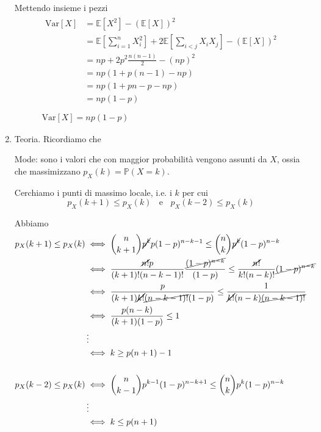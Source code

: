 \begin{enumerate}
\begin{tikzpicture}[x=0.75pt,y=0.75pt,yscale=-1,xscale=1]
\end{tikzpicture}


Mettendo insieme i pezzi\begin{gather*}
\begin{aligned}
\mathrm{Var}[ X] & =\mathbb{E}\left[ X^{2}\right] -(\mathbb{E}[ X])^{2}\\
 & =\mathbb{E}\left[\sum\limits _{i=1}^{n} X_{i}^{2}\right] +2\mathbb{E}\left[\sum\limits _{i< j} X_{i} X_{j}\right] -(\mathbb{E}[ X])^{2}\\
 & =np+2p^{2}\frac{n( n-1)}{2} -( np)^{2}\\
 & =np( 1+p( n-1) -np)\\
 & =np( 1+pn-p-np)\\
 & =np( 1-p)
\end{aligned}\\
\\
\boxed{\mathrm{Var}[ X] =np( 1-p)}
\end{gather*}
\item Teoria. Ricordiamo che

Mode: sono i valori che con maggior probabilità vengono assunti da $X$, ossia che massimizzano $p_{X}( k) =\mathbb{P}( X=k)$.

Cerchiamo i punti di massimo locale, i.e. i $k$ per cui\begin{equation*}
\boxed{p_{X}( k+1) \leq p_{X}( k) \ \ \ \ \text{e} \ \ \ \ p_{X}( k-2) \leq p_{X}( k)}
\end{equation*}

Abbiamo\begin{equation*}
\begin{aligned}
p_{X}( k+1) \leq p_{X}( k) & \iff \binom{n}{k+1}\cancel{p^{k}} p( 1-p)^{n-k-1} \leq \binom{n}{k}\cancel{p^{k}}( 1-p)^{n-k}\\
 & \iff \frac{\cancel{n!} p}{( k+1) !( n-k-1) !}\frac{\cancel{( 1-p)^{n-k}}}{( 1-p)} \leq \frac{\cancel{n!}}{k!( n-k) !}\cancel{( 1-p)^{n-k}}\\
 & \iff \frac{p}{( k+1)\cancel{k!}\cancel{( n-k-1) !}( 1-p)} \leq \frac{1}{\cancel{k!}( n-k)\cancel{( n-k-1) !}}\\
 & \iff \frac{p( n-k)}{( k+1)( 1-p)} \leq 1\\
 & \vdots \\
 & \iff k\geq p( n+1) -1\\
 & \\
p_{X}( k-2) \leq p_{X}( k) & \iff \binom{n}{k-1} p^{k-1}( 1-p)^{n-k+1} \leq \binom{n}{k} p^{k}( 1-p)^{n-k}\\
 & \vdots \\
 & \iff k\leq p( n+1)
\end{aligned}
\end{equation*}


\end{enumerate}
